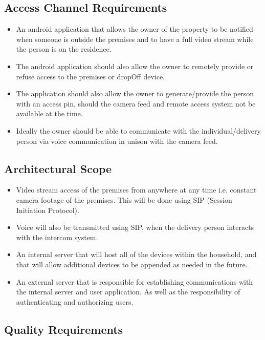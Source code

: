 \documentclass[a4paper,12pt]{article}
\begin{document}
	\subsection{Access Channel Requirements}
	\begin{itemize}
		\item An android application that allows the owner of the property to be notified when someone is outside the premises and to have a full video stream while the person is on the residence.
		
		\item The android application should also allow the owner to remotely provide or refuse access to the premises or dropOff device.
		
		\item The application should also allow the owner to generate/provide the person with an access pin, should the camera feed and remote access system not be available at the time.  
		
		\item Ideally the owner should be able to communicate with the individual/delivery person via voice communication in unison with the camera feed. 
	\end{itemize}
	
	\newpage
	\subsection{Architectural Scope}
	\begin{itemize}
		\item Video stream access of the premises from anywhere at any time i.e. constant camera footage of the premises. This will be done using SIP (Session Initiation Protocol).
		
		\item Voice will also be transmitted using SIP, when the delivery person interacts with the intercom system.
		
		\item An internal server that will host all of the devices within the household, and that will allow additional devices to be appended as needed in the future.
		
		\item An external server that is responsible for establishing communications with the internal server and user application. As well as the responsibility of authenticating and authorizing users. 
	\end{itemize}
	
	\subsection{Quality Requirements}
	
\end{document}
